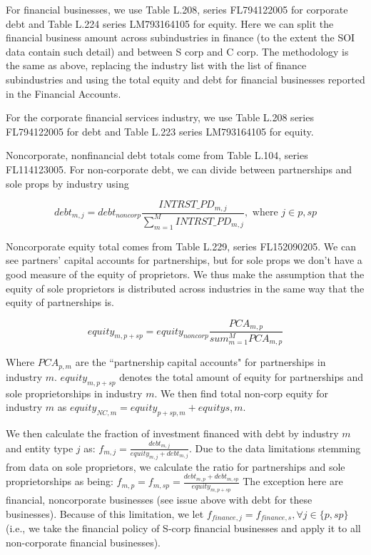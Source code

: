 \documentclass[article,11pt,letterpaper,fleqn]{article}
\theoremstyle{definition}
\numberwithin{equation}{section}
\begin{document}
For financial businesses, we use Table L.208, series FL794122005 for corporate debt and Table L.224 series LM793164105 for equity.  Here we can split the financial business amount across subindustries in finance (to the extent the SOI data contain such detail) and between S corp and C corp.  The methodology is the same as above, replacing the industry list with the list of finance subindustries and using the total equity and debt for financial businesses reported in the Financial Accounts.

For the corporate financial services industry, we use Table L.208 series FL794122005 for debt and Table L.223 series LM793164105 for equity.

Noncorporate, nonfinancial debt totals come from Table L.104, series FL114123005.  For non-corporate debt, we can divide between partnerships and sole props by industry using

\begin{equation}
debt_{m,j} = debt_{noncorp}\frac{INTRST\_PD_{m,j}}{\sum_{m=1}^{M}INTRST\_PD_{m,j}}, \text{ where } j\in{p,sp}
\end{equation}


Noncorporate equity total comes from Table L.229, series FL152090205.  We can see partners' capital accounts for partnerships, but for sole props we don't have a good measure of the equity of proprietors.  We thus make the assumption that the equity of sole proprietors is distributed across industries in the same way that the equity of partnerships is.  

\begin{equation}
equity_{m,p+sp} = equity_{noncorp}\frac{PCA_{m,p}}{sum_{m=1}^{M}PCA_{m,p}}
\end{equation}

Where $PCA_{p,m}$ are the ``partnership capital accounts" for partnerships in industry $m$.  $equity_{m,p+sp}$ denotes the total amount of equity for partnerships and sole proprietorships in industry $m$.  We then find total non-corp equity for industry $m$ as $equity_{NC,m} = equity_{p+sp,m} + equity{s,m}$.  

We then calculate the fraction of investment financed with debt by industry $m$ and entity type $j$ as: $f_{m,j} = \frac{debt_{m,j}}{equity_{m,j}+debt_{m,j}}$.  Due to the data limitations stemming from data on sole proprietors, we calculate the ratio for partnerships and sole proprietorships as being: $f_{m,p} = f_{m,sp} = \frac{debt_{m,p}+debt_{m,sp}}{equity_{m,p+sp}}$  The exception here are financial, noncorporate businesses (see issue above with debt for these businesses).  Because of this limitation, we let $f_{finance,j}=f_{finance,s}, \forall j\in\{p,sp\}$ (i.e., we take the financial policy of S-corp financial businesses and apply it to all non-corporate financial businesses).
\end{document}
